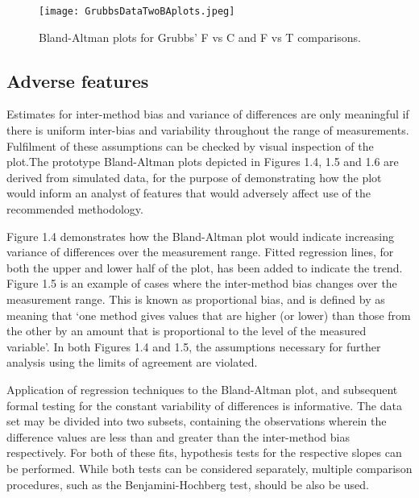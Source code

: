 \documentclass[12pt, a4paper]{report}
\theoremstyle{plain}
\theoremstyle{definition}
\theoremstyle{remark}
\begin{document}
\begin{figure}[h!]
\begin{center}
  \texttt{[image: GrubbsDataTwoBAplots.jpeg]}
  \caption{Bland-Altman plots for Grubbs' F vs C and F vs T comparisons.}\label{GrubbsDataTwoBAplots}
\end{center}
\end{figure}

\newpage


\subsection{Adverse features}

Estimates for inter-method bias and variance of differences are only meaningful if there is uniform inter-bias and variability throughout the range of measurements. Fulfilment of these assumptions can be checked by visual inspection of the plot.The prototype Bland-Altman plots depicted in Figures 1.4, 1.5 and 1.6 are derived from simulated data, for the purpose of demonstrating how the plot would inform an analyst of features that would adversely affect use of the recommended methodology.

Figure 1.4 demonstrates how the Bland-Altman plot would indicate
increasing variance of differences over the measurement range.
Fitted regression lines, for both the upper and lower half of the
plot, has been added to indicate the trend. Figure 1.5 is an
example of cases where the inter-method bias changes over the
measurement range. This is known as proportional bias, and is
defined by \citet{ludbrook97} as meaning that `one method gives
values that are higher (or lower) than those from the other by an
amount that is proportional to the level of the measured
variable'. In both Figures 1.4 and 1.5, the assumptions necessary
for further analysis using the limits of agreement are violated.

Application of regression techniques to the Bland-Altman plot, and
subsequent formal testing for the constant variability of
differences is informative. The data set may be divided into two
subsets, containing the observations wherein the difference values
are less than and greater than the inter-method bias respectively.
For both of these fits, hypothesis tests for the respective slopes
can be performed. While both tests can be considered separately,
multiple comparison procedures, such as the Benjamini-Hochberg
\citep{BH} test, should be also be used.
\end{document}
